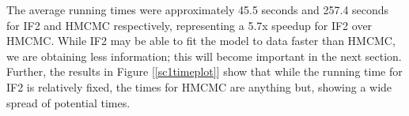     The average running times were approximately 45.5 seconds and 257.4 seconds for IF2 and HMCMC respectively, representing a 5.7x speedup for IF2 over HMCMC. While IF2 may be able to fit the model to data faster than HMCMC, we are obtaining less information; this will become important in the next section. Further, the results in Figure [\ref{sc1timeplot}] show that while the running time for IF2 is relatively fixed, the times for HMCMC are anything but, showing a wide spread of potential times.
